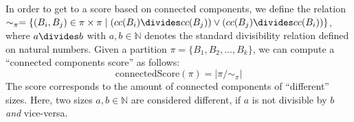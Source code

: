 			In order to get to a score based on connected components, we define the relation $\sim_\pi = \{ (B_i, B_j) \in \pi \times \pi \mid (cc(B_i) \divides cc(B_j)) \lor (cc(B_j) \divides cc(B_i)) \}$, where $a \divides b$ with $a, b \in \mathbb{N}$ denotes the standard divisibility relation defined on natural numbers.
			Given a partition $\pi = \{ B_1, B_2, \ldots, B_k \}$, we can compute a \enquote{connected components score} as follows:
			\begin{equation*}
				\mathrm{connectedScore}(\pi) = |\pi/\sim_\pi|
			\end{equation*}
			The score corresponds to the amount of connected components of \enquote{different} sizes.
			Here, two sizes $a, b \in \mathbb{N}$ are considered different, if $a$ is not divisible by $b$ \textit{and} vice-versa.

			\clearpage
